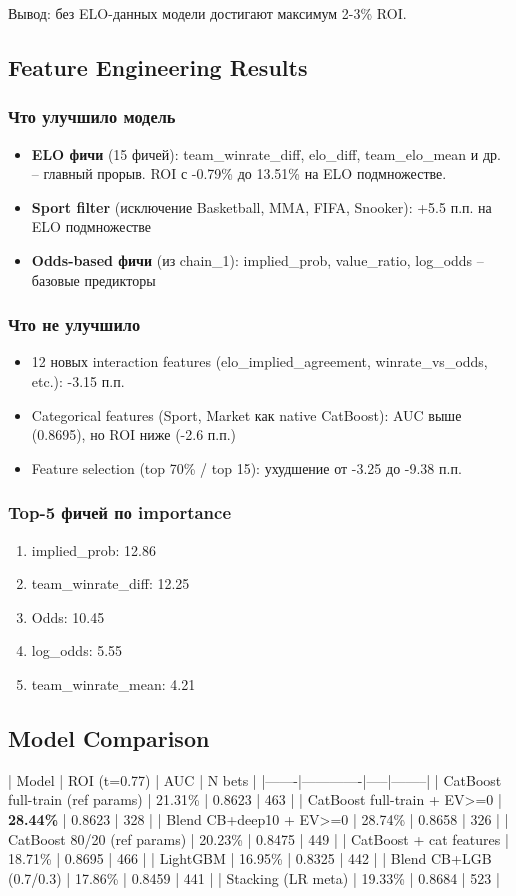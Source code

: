 \documentclass[12pt,a4paper]{article}
\begin{document}
Вывод: без ELO-данных модели достигают максимум 2-3\% ROI.

\subsection{Feature Engineering Results}
\subsubsection{Что улучшило модель}
\begin{itemize}
  \item \textbf{ELO фичи} (15 фичей): team\_winrate\_diff, elo\_diff, team\_elo\_mean и др. -- главный прорыв. ROI с -0.79\% до 13.51\% на ELO подмножестве.
  \item \textbf{Sport filter} (исключение Basketball, MMA, FIFA, Snooker): +5.5 п.п. на ELO подмножестве
  \item \textbf{Odds-based фичи} (из chain\_1): implied\_prob, value\_ratio, log\_odds -- базовые предикторы
\end{itemize}

\subsubsection{Что не улучшило}
\begin{itemize}
  \item 12 новых interaction features (elo\_implied\_agreement, winrate\_vs\_odds, etc.): -3.15 п.п.
  \item Categorical features (Sport, Market как native CatBoost): AUC выше (0.8695), но ROI ниже (-2.6 п.п.)
  \item Feature selection (top 70\% / top 15): ухудшение от -3.25 до -9.38 п.п.
\end{itemize}

\subsubsection{Top-5 фичей по importance}
\begin{enumerate}
  \item implied\_prob: 12.86
  \item team\_winrate\_diff: 12.25
  \item Odds: 10.45
  \item log\_odds: 5.55
  \item team\_winrate\_mean: 4.21
\end{enumerate}

\subsection{Model Comparison}
| Model | ROI (t=0.77) | AUC | N bets |
|-------|-------------|-----|--------|
| CatBoost full-train (ref params) | 21.31\% | 0.8623 | 463 |
| CatBoost full-train + EV>=0 | \textbf{28.44\%} | 0.8623 | 328 |
| Blend CB+deep10 + EV>=0 | 28.74\% | 0.8658 | 326 |
| CatBoost 80/20 (ref params) | 20.23\% | 0.8475 | 449 |
| CatBoost + cat features | 18.71\% | 0.8695 | 466 |
| LightGBM | 16.95\% | 0.8325 | 442 |
| Blend CB+LGB (0.7/0.3) | 17.86\% | 0.8459 | 441 |
| Stacking (LR meta) | 19.33\% | 0.8684 | 523 |
\end{document}
